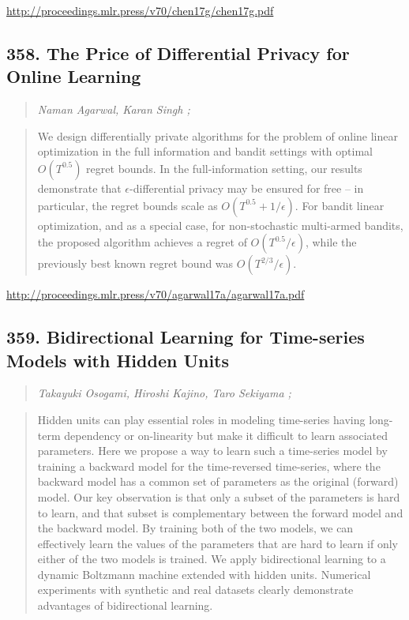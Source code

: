 \documentclass{article}
\begin{document}
\href{http://proceedings.mlr.press/v70/chen17g/chen17g.pdf}{http://proceedings.mlr.press/v70/chen17g/chen17g.pdf}

\subsection{358. The Price of Differential Privacy for Online Learning}

\begin{quote}
\footnotesize{\textit{Naman Agarwal, Karan Singh ;}}
\end{quote}

\begin{quote}
    We design differentially private algorithms for the problem of online linear optimization in the full information and bandit settings with optimal $O(T^{0.5})$ regret bounds. In the full-information setting, our results demonstrate that $\epsilon$-differential privacy may be ensured for free – in particular, the regret bounds scale as $O(T^{0.5}+1/\epsilon)$. For bandit linear optimization, and as a special case, for non-stochastic multi-armed bandits, the proposed algorithm achieves a regret of $O(T^{0.5}/\epsilon)$, while the previously best known regret bound was $O(T^{2/3}/\epsilon)$.  \end{quote}

\href{http://proceedings.mlr.press/v70/agarwal17a/agarwal17a.pdf}{http://proceedings.mlr.press/v70/agarwal17a/agarwal17a.pdf}

\subsection{359. Bidirectional Learning for Time-series Models with Hidden Units}

\begin{quote}
\footnotesize{\textit{Takayuki Osogami, Hiroshi Kajino, Taro Sekiyama ;}}
\end{quote}

\begin{quote}
    Hidden units can play essential roles in modeling time-series having long-term dependency or on-linearity but make it difficult to learn associated parameters. Here we propose a way to learn such a time-series model by training a backward model for the time-reversed time-series, where the backward model has a common set of parameters as the original (forward) model. Our key observation is that only a subset of the parameters is hard to learn, and that subset is complementary between the forward model and the backward model. By training both of the two models, we can effectively learn the values of the parameters that are hard to learn if only either of the two models is trained. We apply bidirectional learning to a dynamic Boltzmann machine extended with hidden units. Numerical experiments with synthetic and real datasets clearly demonstrate advantages of bidirectional learning.  \end{quote}
\end{document}
